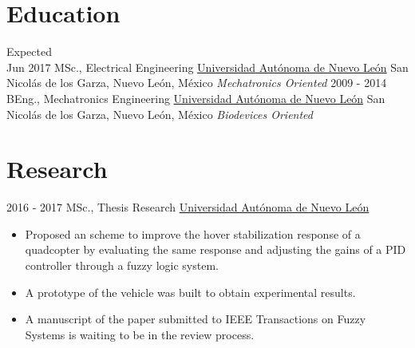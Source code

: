 \documentclass[letterpaper]{twentysecondcv} %
\begin{document}
\makeprofile %

\section{Education}

\begin{twenty} %
	\twentyitem
    	{Expected \\ Jun 2017}
        {MSc., Electrical Engineering}
        {\href{http://www.uanl.mx/}{Universidad Autónoma de Nuevo León}}
        {San Nicolás de los Garza, Nuevo León, México}
        {\textit{Mechatronics Oriented}}
	\twentyitem
    	{2009 - 2014}
        {BEng., Mechatronics Engineering}
        {\href{http://www.uanl.mx/}{Universidad Autónoma de Nuevo León}}
        {San Nicolás de los Garza, Nuevo León, México}
        {\textit{Biodevices Oriented}}
\end{twenty}


\section{Research}
\begin{twenty}
	\twentyitem
    	{2016 - 2017}
        {MSc., Thesis Research}
        {\href{http://www.uanl.mx/}{Universidad Autónoma de Nuevo León}}
        {}
        {
        {\begin{itemize}
        \item Proposed an scheme to improve the hover stabilization response of a quadcopter by evaluating the same response and adjusting the gains of a PID controller through a fuzzy logic system.
        \item A prototype of the vehicle was built to obtain experimental results.
        \item A manuscript of the paper submitted to IEEE Transactions on Fuzzy Systems is waiting to be in the review process.
    \end{itemize}}
        }
\end{twenty}
\end{document}

